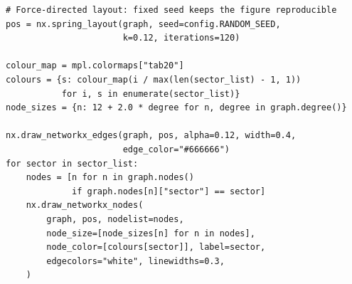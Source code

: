 \begin{lstlisting}[style=python]
# Force-directed layout: fixed seed keeps the figure reproducible
pos = nx.spring_layout(graph, seed=config.RANDOM_SEED,
                       k=0.12, iterations=120)

colour_map = mpl.colormaps["tab20"]
colours = {s: colour_map(i / max(len(sector_list) - 1, 1))
           for i, s in enumerate(sector_list)}
node_sizes = {n: 12 + 2.0 * degree for n, degree in graph.degree()}

nx.draw_networkx_edges(graph, pos, alpha=0.12, width=0.4,
                       edge_color="#666666")
for sector in sector_list:
    nodes = [n for n in graph.nodes()
             if graph.nodes[n]["sector"] == sector]
    nx.draw_networkx_nodes(
        graph, pos, nodelist=nodes,
        node_size=[node_sizes[n] for n in nodes],
        node_color=[colours[sector]], label=sector,
        edgecolors="white", linewidths=0.3,
    )
\end{lstlisting}
